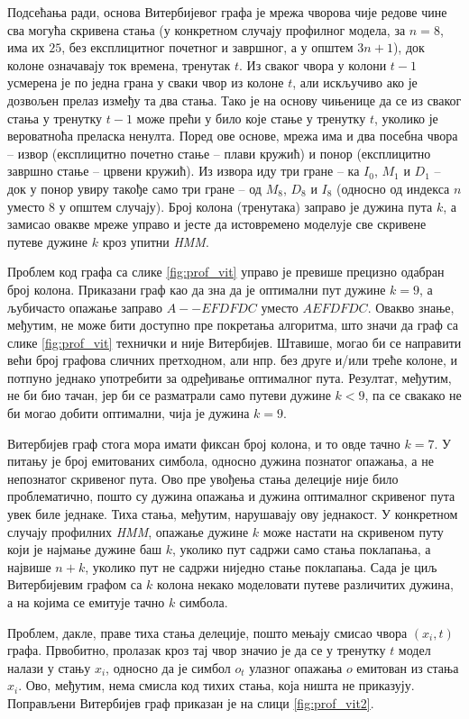 \documentclass[12pt,oneside]{memoir}
\begin{document}
\begin{CJK}{UTF8}{ipxm}
Подсећања ради, основа Витербијевог графа је мрежа чворова чије редове чине сва могућа скривена стања (у конкретном случају профилног модела, за $n = 8$, има их $25$, без експлицитног почетног и завршног, а у општем $3n+1$), док колоне означавају ток времена, тренутак $t$. Из сваког чвора у колони $t-1$ усмерена је по једна грана у сваки чвор из колоне $t$, али искључиво ако је дозвољен прелаз између та два стања. Тако је на основу чињенице да се из сваког стања у тренутку $t-1$ може прећи у било које стање у тренутку $t$, уколико је вероватноћа преласка ненулта. Поред ове основе, мрежа има и два посебна чвора -- извор (експлицитно почетно стање -- плави кружић) и понор (експлицитно завршно стање -- црвени кружић). Из извора иду три гране -- ка $I_0$, $M_1$ и $D_1$ -- док у понор увиру такође само три гране -- од $M_8$, $D_8$ и $I_8$ (односно од индекса $n$ уместо $8$ у општем случају). Број колона (тренутака) заправо је дужина пута $k$, а замисао овакве мреже управо и јесте да истовремено моделује све скривене путеве дужине $k$ кроз упитни \textit{HMM}.

Проблем код графа са слике \ref{fig:prof_vit} управо је превише прецизно одабран број колона. Приказани граф као да зна да је оптимални пут дужине $k = 9$, а љубичасто опажање заправо $A--EFDFDC$ уместо $AEFDFDC$. Овакво знање, међутим, не може бити доступно пре покретања алгоритма, што значи да граф са слике \ref{fig:prof_vit} технички и није Витербијев. Штавише, могао би се направити већи број графова сличних претходном, али нпр. без друге и/или треће колоне, и потпуно једнако употребити за одређивање оптималног пута. Резултат, међутим, не би био тачан, јер би се разматрали само путеви дужине $k < 9$, па се свакако не би могао добити оптимални, чија је дужина $k = 9$.

Витербијев граф стога мора имати фиксан број колона, и то овде тачно $k = 7$. У питању је број емитованих симбола, односно дужина познатог опажања, а не непознатог скривеног пута. Ово пре увођења стања делеције није било проблематично, пошто су дужина опажања и дужина оптималног скривеног пута увек биле једнаке. Тиха стања, међутим, нарушавају ову једнакост. У конкретном случају профилних \textit{HMM}, опажање дужине $k$ може настати на скривеном путу који је најмање дужине баш $k$, уколико пут садржи само стања поклапања, а највише $n+k$, уколико пут не садржи ниједно стање поклапања. Сада је циљ Витербијевим графом са $k$ колона некако моделовати путеве различитих дужина, а на којима се емитује тачно $k$ симбола.

Проблем, дакле, праве тиха стања делеције, пошто мењају смисао чвора $(x_i, t)$ графа. Првобитно, пролазак кроз тај чвор значио је да се у тренутку $t$ модел налази у стању $x_i$, односно да је симбол $o_t$ улазног опажања $o$ емитован из стања $x_i$. Ово, међутим, нема смисла код тихих стања, која ништа не приказују. Поправљени Витербијев граф приказан је на слици \ref{fig:prof_vit2}.


\end{CJK}
\end{document}
